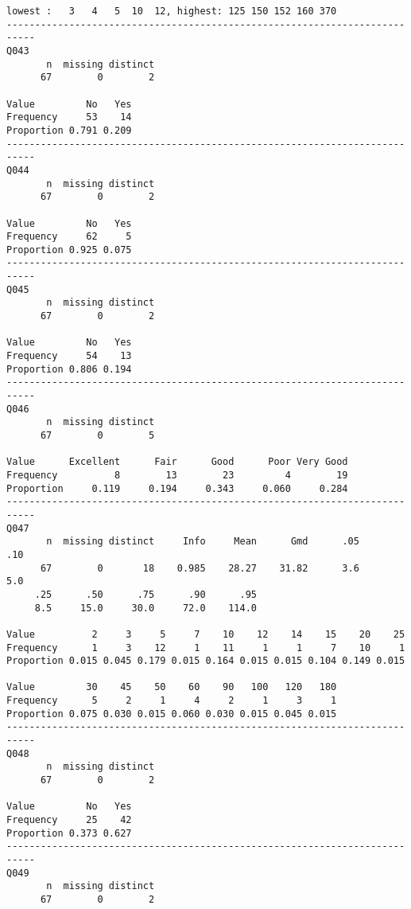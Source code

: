 \documentclass[]{article}
\begin{document}
\begin{verbatim}
lowest :   3   4   5  10  12, highest: 125 150 152 160 370
---------------------------------------------------------------------------
Q043 
       n  missing distinct 
      67        0        2 
                      
Value         No   Yes
Frequency     53    14
Proportion 0.791 0.209
---------------------------------------------------------------------------
Q044 
       n  missing distinct 
      67        0        2 
                      
Value         No   Yes
Frequency     62     5
Proportion 0.925 0.075
---------------------------------------------------------------------------
Q045 
       n  missing distinct 
      67        0        2 
                      
Value         No   Yes
Frequency     54    13
Proportion 0.806 0.194
---------------------------------------------------------------------------
Q046 
       n  missing distinct 
      67        0        5 
                                                            
Value      Excellent      Fair      Good      Poor Very Good
Frequency          8        13        23         4        19
Proportion     0.119     0.194     0.343     0.060     0.284
---------------------------------------------------------------------------
Q047 
       n  missing distinct     Info     Mean      Gmd      .05      .10 
      67        0       18    0.985    28.27    31.82      3.6      5.0 
     .25      .50      .75      .90      .95 
     8.5     15.0     30.0     72.0    114.0 
                                                                      
Value          2     3     5     7    10    12    14    15    20    25
Frequency      1     3    12     1    11     1     1     7    10     1
Proportion 0.015 0.045 0.179 0.015 0.164 0.015 0.015 0.104 0.149 0.015
                                                          
Value         30    45    50    60    90   100   120   180
Frequency      5     2     1     4     2     1     3     1
Proportion 0.075 0.030 0.015 0.060 0.030 0.015 0.045 0.015
---------------------------------------------------------------------------
Q048 
       n  missing distinct 
      67        0        2 
                      
Value         No   Yes
Frequency     25    42
Proportion 0.373 0.627
---------------------------------------------------------------------------
Q049 
       n  missing distinct 
      67        0        2 
                      

\end{verbatim}
\end{document}
